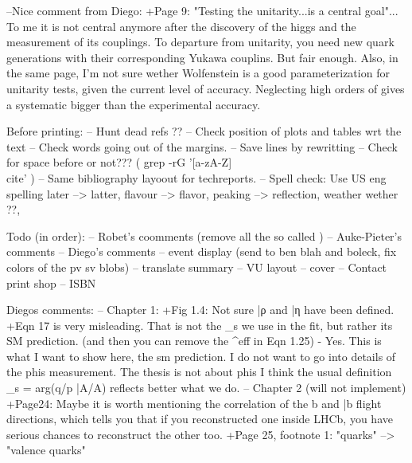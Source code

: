 --Nice comment from Diego: +Page 9: "Testing the unitarity...is a central goal"... To me it is not central anymore after the discovery
of the higgs and the measurement of its couplings. To departure from unitarity, you need new quark
generations with their corresponding Yukawa couplins. But fair enough.
 Also, in the same page, I'm not sure wether Wolfenstein is a good parameterization for unitarity tests,
given the current level of accuracy. Neglecting high orders of \lambda gives a systematic bigger than
the experimental accuracy.


Before printing:
-- Hunt dead refs ??
-- Check position of plots and tables wrt the text
-- Check words going out of the margins.
-- Save lines by rewritting
-- Check for space before \cite{} or not??? ( grep -rG  '[a-zA-Z]\\cite' )
-- Same bibliography layoout for techreports.
-- Spell check:  Use US eng spelling  later --> latter, flavour --> flavor, peaking --> reflection, weather wether ??,

Todo (in order):
-- Robet's coomments (remove all the so called )
-- Auke-Pieter's comments
-- Diego's comments
-- event display (send to ben blah and boleck, fix colors of the pv sv blobs)
-- translate summary
-- VU layout
-- cover
-- Contact print shop
-- ISBN

Diegos comments:
-- Chapter 1:
  +Fig 1.4: Not sure \bar{ρ} and \bar{η} have been defined.
  +Eqn 17 is very misleading. That is not the \phi_s we use in the fit, but rather its
          SM prediction. (and then you can remove the ^{eff} in Eqn 1.25)
  - Yes. This is what I want to show here, the sm prediction. I do not want to go into
          details of the phis measurement. The thesis is not about phis I think the usual definition \phi_s = arg(q/p \bar{A}/{A}) reflects better what we do.
-- Chapter 2 (will not implement)
  +Page24: Maybe it is worth mentioning the correlation of the b and \bar{b} flight directions,
           which tells you that if you reconstructed one inside LHCb, you have serious chances to reconstruct the other too.
  +Page 25, footnote 1: "quarks" --> "valence quarks"

